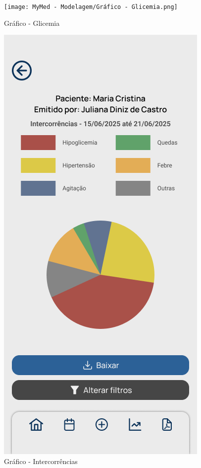 \begin{figure}[!htbp]
	\centering
	\texttt{[image: MyMed - Modelagem/Gráfico - Glicemia.png]}
	\caption{Gráfico - Glicemia}
	\label{grafico_glicemia}
\end{figure}

\begin{figure}[!htbp]
	\centering
	\includegraphics[width=0.6\linewidth]{MyMed - Modelagem/Gráfico - Intercorrências.png}
	\caption{Gráfico - Intercorrências}
	\label{grafico_intercorrencias}
\end{figure}

